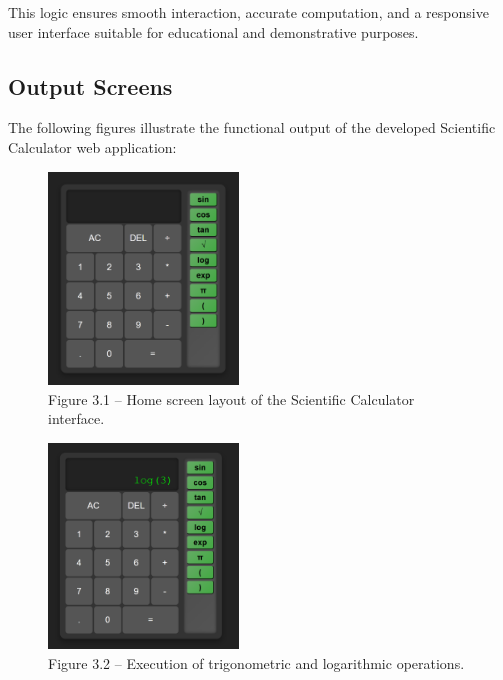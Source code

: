 \documentclass[a4paper,12pt,oneside]{report}
\numberwithin{equation}{chapter}
\numberwithin{figure}{chapter}
\numberwithin{table}{chapter}
\begin{document}
This logic ensures smooth interaction, accurate computation, and a responsive user interface suitable for educational and demonstrative purposes.

\bigskip
\noindent
\subsection{Output Screens}

The following figures illustrate the functional output of the developed Scientific Calculator web application:

\begin{figure}[H]
    \centering
    \includegraphics[width=0.45\textwidth, keepaspectratio]{home_calc.png}
    \caption{Figure 3.1 – Home screen layout of the Scientific Calculator interface.}
    \label{fig:Calculator Home Screen}
\end{figure}

\begin{figure}[H]
    \centering
    \includegraphics[width=0.45\textwidth, keepaspectratio]{log_calc.png}
    \caption{Figure 3.2 – Execution of trigonometric and logarithmic operations.}
    \label{fig:Calculator Logarithmic Operations}
\end{figure}
\end{document}
